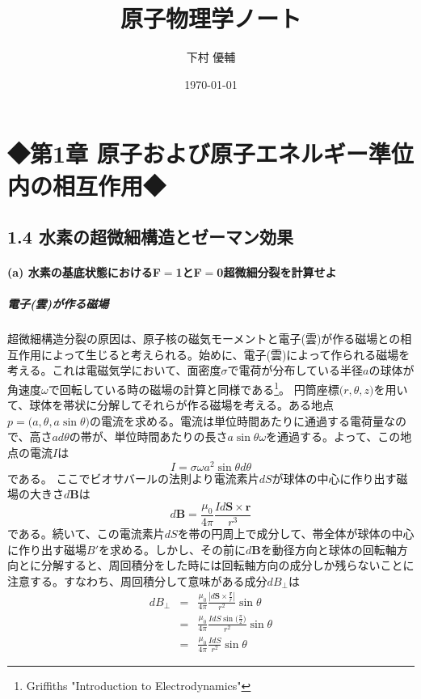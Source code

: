 \documentclass[11pt,a4paper]{jsarticle}
\begin{document}
\title{原子物理学ノート}
\author{下村 優輔}
\date{\today}
\maketitle
%
\section*{◆第1章 原子および原子エネルギー準位内の相互作用◆}
\subsection*{1.4 水素の超微細構造とゼーマン効果}
\paragraph{(a) 水素の基底状態におけるF$=$1とF$=$0超微細分裂を計算せよ\\}
\subparagraph{電子(雲)が作る磁場}
超微細構造分裂の原因は、原子核の磁気モーメントと電子(雲)が作る磁場との相互作用によって生じると考えられる。始めに、電子(雲)によって作られる磁場を考える。これは電磁気学において、面密度$\sigma$で電荷が分布している半径$a$の球体が角速度$\omega$で回転している時の磁場の計算と同様である\footnote{Griffiths "Introduction to Electrodynamics"}。
円筒座標$\bigl(r,\theta,z\bigr)$を用いて、球体を帯状に分解してそれらが作る磁場を考える。ある地点$p=\bigl(a,\theta,a\sin\theta\bigr)$の電流を求める。電流は単位時間あたりに通過する電荷量なので、高さ$ad\theta$の帯が、単位時間あたりの長さ$a\sin\theta\omega$を通過する。よって、この地点の電流$I$は
\begin{equation}
  \label{current}
  I = \sigma\omega a^{2} \sin\theta d\theta
\end{equation}
である。
ここでビオサバールの法則より電流素片$dS$が球体の中心に作り出す磁場の大きさ$d\bm{B}$は
\begin{equation}
  d\bm{B} = \frac{\mu_0}{4\pi} \frac{I d\bm{S} \times \bm{r}}{r^{3}}
\end{equation}
である。続いて、この電流素片$dS$を帯の円周上で成分して、帯全体が球体の中心に作り出す磁場$B'$を求める。しかし、その前に$d\bm{B}$を動径方向と球体の回転軸方向とに分解すると、周回積分をした時には回転軸方向の成分しか残らないことに注意する。すなわち、周回積分して意味がある成分$dB_\bot$は
\begin{eqnarray}
  dB_\bot&=& \frac{\mu_0}{4\pi} \frac{|d\bm{S} \times \frac{\bm{r}}{r}|}{r^2} \sin\theta \\
  &=& \frac{\mu_0}{4\pi} \frac{IdS \sin\bigl(\frac{\pi}{2}\bigr)}{r^2}\sin\theta\\
  &=& \frac{\mu_0}{4\pi} \frac{IdS}{r^2} \sin\theta
\end{eqnarray}
\end{document}
